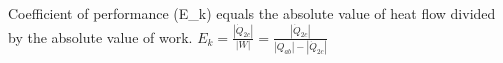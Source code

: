 Coefficient of performance (E_k) equals the absolute value of heat flow divided by the absolute value of work.  
\( E_k = \frac{|\dot{Q}_{2c}|}{|W|} = \frac{|\dot{Q}_{2c}|}{|Q_{ab}| - |\dot{Q}_{2c}|} \)